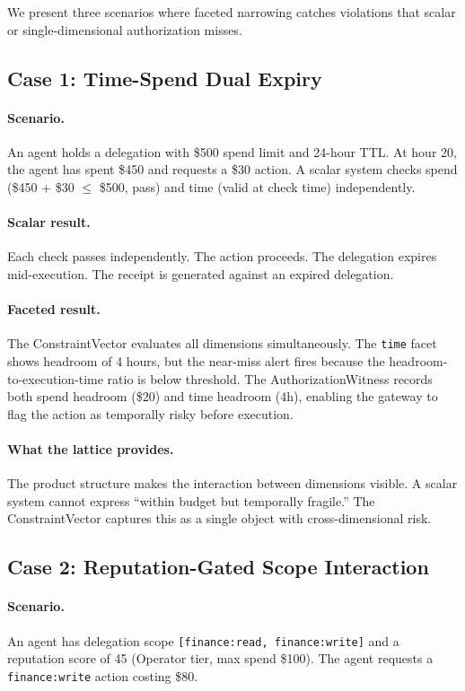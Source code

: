 \documentclass[sigconf,nonacm]{acmart}
\begin{document}
We present three scenarios where faceted narrowing catches violations that scalar or
single-dimensional authorization misses.

\subsection{Case 1: Time-Spend Dual Expiry}

\paragraph{Scenario.} An agent holds a delegation with \$500 spend limit and 24-hour TTL.
At hour 20, the agent has spent \$450 and requests a \$30 action. A scalar system checks
spend (\$450 + \$30 $\leq$ \$500, pass) and time (valid at check time) independently.

\paragraph{Scalar result.} Each check passes independently. The action proceeds. The
delegation expires mid-execution. The receipt is generated against an expired delegation.

\paragraph{Faceted result.} The ConstraintVector evaluates all dimensions simultaneously.
The \texttt{time} facet shows headroom of 4 hours, but the near-miss alert fires because
the headroom-to-execution-time ratio is below threshold. The AuthorizationWitness records
both spend headroom (\$20) and time headroom (4h), enabling the gateway to flag the
action as temporally risky before execution.

\paragraph{What the lattice provides.} The product structure makes the interaction between
dimensions visible. A scalar system cannot express ``within budget but temporally fragile.''
The ConstraintVector captures this as a single object with cross-dimensional risk.

\subsection{Case 2: Reputation-Gated Scope Interaction}

\paragraph{Scenario.} An agent has delegation scope \texttt{[finance:read, finance:write]}
and a reputation score of 45 (Operator tier, max spend \$100). The agent requests a
\texttt{finance:write} action costing \$80.
\end{document}
